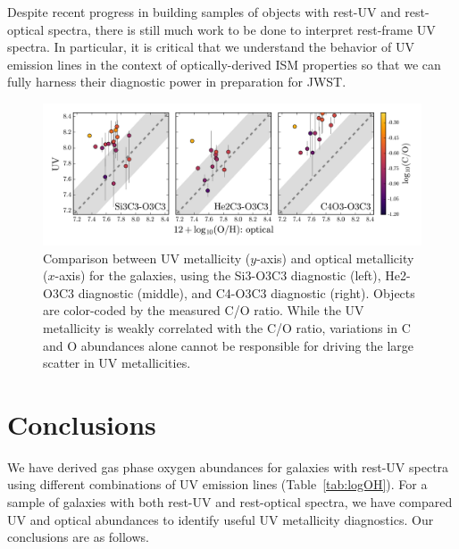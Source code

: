 \documentclass[trackchanges, preprint2]{aastex62}
\begin{document}
Despite recent progress in building samples of objects with rest-UV and rest-optical spectra, there is still much work to be done to interpret rest-frame UV spectra. In particular, it is critical that we understand the behavior of UV emission lines in the context of optically-derived ISM properties so that we can fully harness their diagnostic power in preparation for JWST.

\begin{figure}
  \begin{center}
    \includegraphics[width=\linewidth]{figs/f10.png}
    \caption{Comparison between UV metallicity ($y$-axis) and optical metallicity ($x$-axis) for the \citet{Berg+2016} galaxies, using the Si3-O3C3 diagnostic (left), He2-O3C3 diagnostic (middle), and C4-O3C3 diagnostic (right). Objects are color-coded by the measured C/O ratio. While the UV metallicity is weakly correlated with the C/O ratio, variations in C and O abundances alone cannot be responsible for driving the large scatter in UV metallicities.}
    \label{fig:CO}
  \end{center}
\end{figure}

\section{Conclusions}\label{sec:conclusions}
We have derived gas phase oxygen abundances for galaxies with rest-UV spectra using different combinations of UV emission lines (Table~\ref{tab:logOH}). For a sample of galaxies with both rest-UV and rest-optical spectra, we have compared UV and optical abundances to identify useful UV metallicity diagnostics. Our conclusions are as follows.
\end{document}
